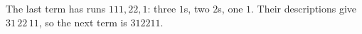 The last term has runs $111,22,1$: three $1$s, two $2$s, one $1$. Their descriptions give $31\,22\,11$, so the next term is $\boxed{312211}$.
